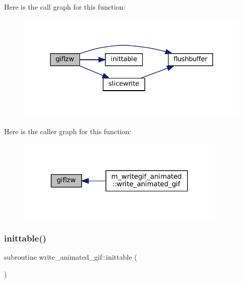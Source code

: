 Here is the call graph for this function\+:\nopagebreak
\begin{figure}[H]
\begin{center}
\leavevmode
\includegraphics[width=329pt]{M__writegif__animated_8f90_aa30b256c6cb90f13a18e32768d35696b_cgraph}
\end{center}
\end{figure}
Here is the caller graph for this function\+:\nopagebreak
\begin{figure}[H]
\begin{center}
\leavevmode
\includegraphics[width=282pt]{M__writegif__animated_8f90_aa30b256c6cb90f13a18e32768d35696b_icgraph}
\end{center}
\end{figure}
\mbox{\label{M__writegif__animated_8f90_acd7274fbac8690a12be91b542378a4eb}} 
\subsubsection{\texorpdfstring{inittable()}{inittable()}}
{\footnotesize\ttfamily subroutine write\+\_\+animated\+\_\+gif\+::inittable (\begin{DoxyParamCaption}{ }\end{DoxyParamCaption})\hspace{0.3cm}{\ttfamily [private]}}

